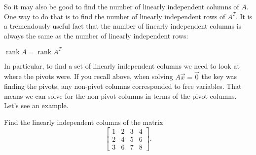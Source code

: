 \documentclass{ximera}
\begin{document}
So it may also be good to find the number of linearly independent columns of $A$.  One way to do that is to find the number of linearly independent rows of $A^T$.  It is a tremendously useful fact that the number of linearly independent columns is always the same as the number of linearly independent rows:

\begin{theorem}{}
    $\operatorname{rank} A = \operatorname{rank} A^T$
\end{theorem}

In particular, to find a set of linearly independent columns we need to look at where the pivots were.  If you recall above, when solving $A \vec{x} = \vec{0}$ the key was finding the pivots, any non-pivot columns corresponded to free variables.  That means we can solve for the non-pivot columns in terms of the pivot columns.  Let's see an example. 
\begin{example}
    Find the linearly independent columns of the matrix
    \begin{equation*}
        \begin{bmatrix}
            1 & 2 & 3 & 4 \\
            2 & 4 & 5 & 6 \\
            3 & 6 & 7 & 8
        \end{bmatrix} .
    \end{equation*}
\end{example}
\end{document}
